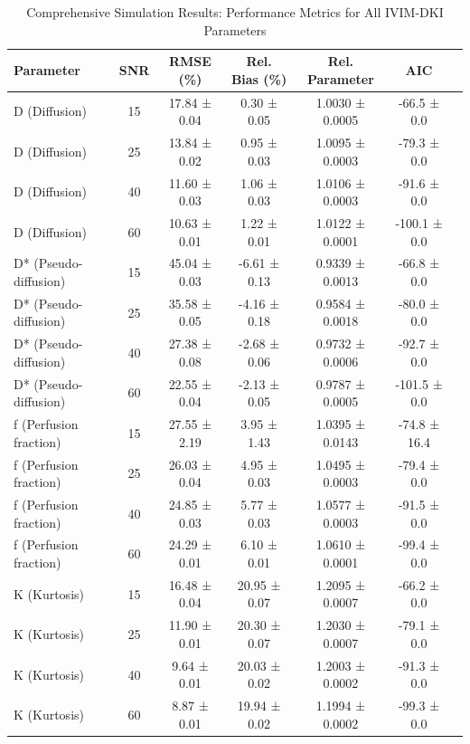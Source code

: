 \documentclass[a4paper,12pt]{article}
\begin{document}
\begin{table}[H]
    \centering
    \caption{Comprehensive Simulation Results: Performance Metrics for All IVIM-DKI Parameters}
    \begin{tabular}{@{}lcccccc@{}}
        \toprule
        Parameter & SNR & RMSE (\%) & Rel. Bias (\%) & Rel. Parameter & AIC \\
        \midrule
        D (Diffusion) & 15 & 17.84 ± 0.04 & 0.30 ± 0.05 & 1.0030 ± 0.0005 & -66.5 ± 0.0 \\
        D (Diffusion) & 25 & 13.84 ± 0.02 & 0.95 ± 0.03 & 1.0095 ± 0.0003 & -79.3 ± 0.0 \\
        D (Diffusion) & 40 & 11.60 ± 0.03 & 1.06 ± 0.03 & 1.0106 ± 0.0003 & -91.6 ± 0.0 \\
        D (Diffusion) & 60 & 10.63 ± 0.01 & 1.22 ± 0.01 & 1.0122 ± 0.0001 & -100.1 ± 0.0 \\
        \midrule
        D* (Pseudo-diffusion) & 15 & 45.04 ± 0.03 & -6.61 ± 0.13 & 0.9339 ± 0.0013 & -66.8 ± 0.0 \\
        D* (Pseudo-diffusion) & 25 & 35.58 ± 0.05 & -4.16 ± 0.18 & 0.9584 ± 0.0018 & -80.0 ± 0.0 \\
        D* (Pseudo-diffusion) & 40 & 27.38 ± 0.08 & -2.68 ± 0.06 & 0.9732 ± 0.0006 & -92.7 ± 0.0 \\
        D* (Pseudo-diffusion) & 60 & 22.55 ± 0.04 & -2.13 ± 0.05 & 0.9787 ± 0.0005 & -101.5 ± 0.0 \\
        \midrule
        f (Perfusion fraction) & 15 & 27.55 ± 2.19 & 3.95 ± 1.43 & 1.0395 ± 0.0143 & -74.8 ± 16.4 \\
        f (Perfusion fraction) & 25 & 26.03 ± 0.04 & 4.95 ± 0.03 & 1.0495 ± 0.0003 & -79.4 ± 0.0 \\
        f (Perfusion fraction) & 40 & 24.85 ± 0.03 & 5.77 ± 0.03 & 1.0577 ± 0.0003 & -91.5 ± 0.0 \\
        f (Perfusion fraction) & 60 & 24.29 ± 0.01 & 6.10 ± 0.01 & 1.0610 ± 0.0001 & -99.4 ± 0.0 \\
        \midrule
        K (Kurtosis) & 15 & 16.48 ± 0.04 & 20.95 ± 0.07 & 1.2095 ± 0.0007 & -66.2 ± 0.0 \\
        K (Kurtosis) & 25 & 11.90 ± 0.01 & 20.30 ± 0.07 & 1.2030 ± 0.0007 & -79.1 ± 0.0 \\
        K (Kurtosis) & 40 & 9.64 ± 0.01 & 20.03 ± 0.02 & 1.2003 ± 0.0002 & -91.3 ± 0.0 \\
        K (Kurtosis) & 60 & 8.87 ± 0.01 & 19.94 ± 0.02 & 1.1994 ± 0.0002 & -99.3 ± 0.0 \\
        \bottomrule
    \end{tabular}
    \label{tab:comprehensive_simulation}
\end{table}
\end{document}
